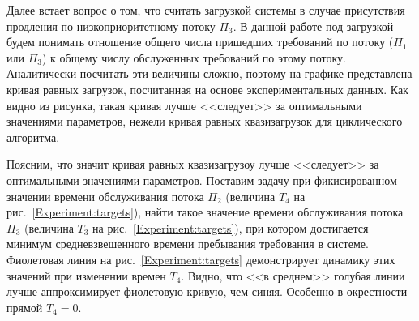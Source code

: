 \documentclass[a4paper,12pt,russian]{extarticle}
\begin{document}
Далее встает вопрос о том, что считать загрузкой системы в случае присутствия продления по низкоприоритетному потоку $\Pi_3$. В данной работе под загрузкой будем понимать отношение общего числа пришедших требований по потоку ($\Pi_1$ или $\Pi_3$) к общему числу обслуженных требований по этому потоку. Аналитически посчитать эти величины сложно, поэтому на графике представлена кривая равных загрузок, посчитанная на основе экспериментальных данных. Как видно из рисунка, такая кривая лучше <<следует>> за оптимальными значениями параметров, нежели кривая равных квазизагрузок для циклического алгоритма.

Поясним, что значит кривая равных квазизагрузоу лучше <<следует>> за оптимальными значениями параметров. Поставим задачу при фикисированном значении времени обслуживания потока $\Pi_2$ (величина $T_4$ на рис.~\ref{Experiment:targets}), найти такое значение времени обслуживания потока $\Pi_3$ (величина $T_3$ на рис.~\ref{Experiment:targets}), при котором достигается минимум средневзвешенного времени пребывания требования в системе. Фиолетовая линия на рис.~\ref{Experiment:targets} демонстрирует динамику этих значений при изменении времен $T_4$. Видно, что <<в среднем>> голубая линии лучше аппроксимирует фиолетовую кривую, чем синяя. Особенно в окрестности прямой $T_4=0$. 
\end{document}
